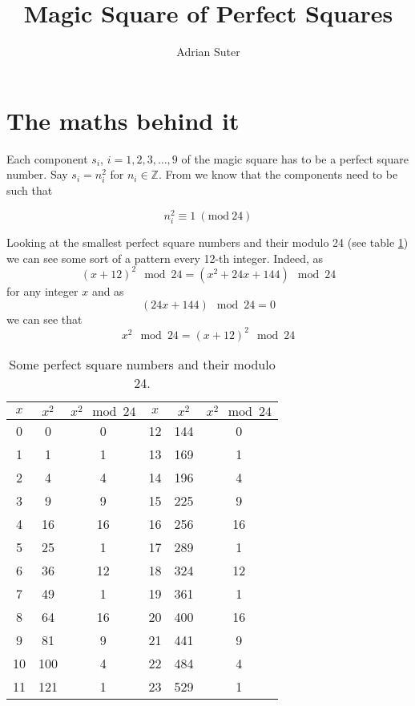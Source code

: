 \documentclass[reqno,10pt,a4paper]{article}
\title{Magic Square of Perfect Squares}
\author{Adrian Suter}
\begin{document}
	
	\maketitle
	
	\section{The maths behind it}
	
	Each component $s_i$, $i = 1, 2, 3, \ldots, 9$ of the magic square has to be a perfect square number. Say $s_i = n_i^2$ for $n_i \in \mathbb{Z}$. From \cite{zimmermann2015} we know that the components need to be such that
	
	\begin{equation} \label{eq:conditionMod24}
		n_i^2 \equiv 1~(\textrm{mod}~24)
	\end{equation}
	
	Looking at the smallest perfect square numbers and their modulo 24 (see table \ref{perfectSquares}) we can see some sort of a pattern every 12-th integer. Indeed, as
	\begin{equation}
	(x + 12)^2 \mod 24 = (x^2 + 24x + 144) \mod 24
	\end{equation}
	for any integer $x$ and as
	\begin{equation}
	(24x + 144) \mod 24 = 0
	\end{equation}
	we can see that
	\begin{equation}
	x^2 \mod 24 = (x + 12)^2 \mod 24
	\end{equation}
	
	\begin{table}
			\begin{tabular}{|c|c|c||c|c|c|}
			\hline
			$x$ & $x^2$ & $x^2 \mod 24$ & $x$ & $x^2$ & $x^2 \mod 24$ \\
			\hline
			0 & 0 & 0 & 12 & 144 & 0 \\
			1 & 1 & 1 & 13 & 169 & 1 \\
			2 & 4 & 4 & 14 & 196 & 4 \\
			3 & 9 & 9 & 15 & 225 & 9 \\
			4 & 16 & 16 & 16 & 256 & 16 \\
			5 & 25 & 1 & 17 & 289 & 1 \\
			6 & 36 & 12 & 18 & 324 & 12 \\
			7 & 49 & 1 & 19 & 361 & 1 \\
			8 & 64 & 16 & 20 & 400 & 16 \\
			9 & 81 & 9 & 21 & 441 & 9 \\
			10 & 100 & 4 & 22 & 484 & 4 \\
			11 & 121 & 1 & 23 & 529 & 1 \\
			\hline
		\end{tabular}
		\caption{Some perfect square numbers and their modulo 24.} \label{perfectSquares}
	\end{table}
	
\end{document}
